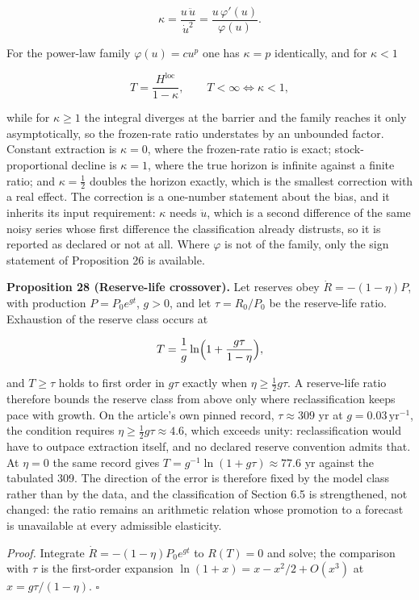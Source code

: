 \documentclass[11pt]{article}
\begin{document}
$$\kappa=\frac{u\,\ddot u}{\dot u^{2}}=\frac{u\,\varphi'(u)}{\varphi(u)} .$$

 For the power-law family \(\varphi(u)=cu^{p}\) one has \(\kappa=p\) identically, and for \(\kappa<1\) 

$$T=\frac{H^{\mathrm{loc}}}{1-\kappa}, \qquad T<\infty\iff\kappa<1,$$

 while for \(\kappa\ge1\) the integral diverges at the barrier and the family reaches it only asymptotically, so the frozen-rate ratio understates by an unbounded factor. Constant extraction is \(\kappa=0\), where the frozen-rate ratio is exact; stock-proportional decline is \(\kappa=1\), where the true horizon is infinite against a finite ratio; and \(\kappa=\tfrac12\) doubles the horizon exactly, which is the smallest correction with a real effect. The correction is a one-number statement about the bias, and it inherits its input requirement: \(\kappa\) needs \(\ddot u\), which is a second difference of the same noisy series whose first difference the classification already distrusts, so it is reported as declared or not at all. Where \(\varphi\) is not of the family, only the sign statement of Proposition 26 is available.

\textbf{Proposition 28 (Reserve-life crossover).} Let reserves obey \(\dot R=-(1-\eta)P\), with production \(P=P_0e^{gt}\), \(g>0\), and let \(\tau=R_0/\allowbreak{}P_0\) be the reserve-life ratio. Exhaustion of the reserve class occurs at 

$$T=\frac1g\ln\Bigl(1+\frac{g\tau}{1-\eta}\Bigr),$$

 and \(T\ge\tau\) holds to first order in \(g\tau\) exactly when \(\eta\ge\tfrac12g\tau\). A reserve-life ratio therefore bounds the reserve class from above only where reclassification keeps pace with growth. On the article's own pinned record, \(\tau\approx309\) yr at \(g=0.03\,\mathrm{yr}^{-1}\), the condition requires \(\eta\ge\tfrac12g\tau\approx4.6\), which exceeds unity: reclassification would have to outpace extraction itself, and no declared reserve convention admits that. At \(\eta=0\) the same record gives \(T=\allowbreak{}g^{-1}\ln(1+\allowbreak{}g\tau)\approx77.6\) yr against the tabulated 309. The direction of the error is therefore fixed by the model class rather than by the data, and the classification of Section 6.5 is strengthened, not changed: the ratio remains an arithmetic relation whose promotion to a forecast is unavailable at every admissible elasticity.

\emph{Proof.} Integrate \(\dot R=-(1-\eta)P_0e^{gt}\) to \(R(T)=0\) and solve; the comparison with \(\tau\) is the first-order expansion \(\ln(1+\allowbreak{}x)=\allowbreak{}x-x^2/\allowbreak{}2+\allowbreak{}O(x^3)\) at \(x=g\tau/(1-\eta)\). \(\square\)
\end{document}
